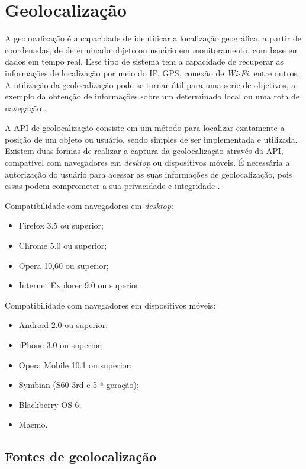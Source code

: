 \section{Geolocalização}

A geolocalização é a capacidade de identificar a localização geográfica, a partir de coordenadas, de determinado objeto ou usuário em monitoramento, com base em dados em tempo real. Esse tipo de sistema tem a capacidade de recuperar as informações de localização por meio do IP, GPS, conexão de \textit{Wi-Fi}, entre outros. A utilização da geolocalização pode se tornar útil para uma serie de objetivos, a exemplo da obtenção de informações sobre um determinado local ou uma rota de navegação \cite{geolocalizacao:2011}.

A API de geolocalização consiste em um método para localizar exatamente a posição de um objeto ou usuário, sendo simples de ser implementada e utilizada. Existem duas formas de realizar a captura da geolocalização através da API, compatível com navegadores em \textit{desktop} ou dispositivos móveis. É necessária a autorização do usuário para acessar as suas informações de geolocalização, pois essas podem comprometer a sua privacidade e integridade \cite{geolocalizacao:2011}.

Compatibilidade com navegadores em \textit{desktop}:
\begin{itemize}
    \item Firefox 3.5 ou superior;
    \item Chrome 5.0 ou superior;
    \item Opera 10,60 ou superior;
    \item Internet Explorer 9.0 ou superior. \\
\end{itemize}

Compatibilidade com navegadores em dispositivos móveis:
\begin{itemize}
    \item Android 2.0 ou superior;
    \item iPhone 3.0 ou superior;
    \item Opera Mobile 10.1 ou superior;
    \item Symbian (S60 3rd e 5 ª geração);
    \item Blackberry OS 6;
    \item Maemo.
\end{itemize}

\subsection{Fontes de geolocalização}

